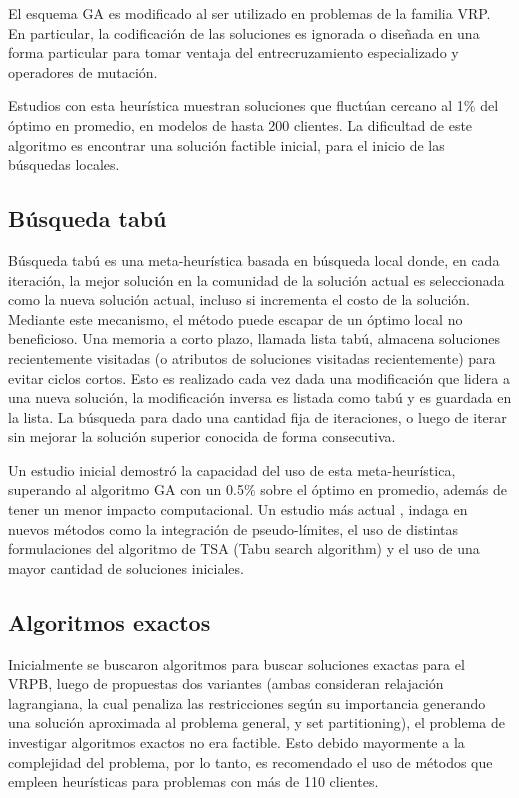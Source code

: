 \documentclass[letter, 10pt]{article}
\begin{document}
El esquema GA es modificado al ser utilizado en problemas de la familia VRP. En particular, la codificación de las soluciones es ignorada o diseñada en una forma particular para tomar ventaja del entrecruzamiento especializado y operadores de mutación.

Estudios \cite{potvin1996genetic} con esta heurística muestran soluciones que fluctúan cercano al 1\% del óptimo en promedio, en modelos de hasta 200 clientes. La dificultad de este algoritmo es encontrar una solución factible inicial, para el inicio de las búsquedas locales.

\subsection{Búsqueda tabú}
Búsqueda tabú \cite{glover1997tabu} es una meta-heurística basada en búsqueda local donde, en cada iteración, la mejor solución en la comunidad de la solución actual es seleccionada como la nueva solución actual, incluso si incrementa el costo de la solución. Mediante este mecanismo, el método puede escapar de un óptimo local no beneficioso. Una memoria a corto plazo, llamada lista tabú, almacena soluciones recientemente visitadas (o atributos de soluciones visitadas recientemente) para evitar ciclos cortos. Esto es realizado cada vez dada una modificación que lidera a una nueva solución, la modificación inversa es listada como tabú y es guardada en la lista. La búsqueda para dado una cantidad fija de iteraciones, o luego de iterar sin mejorar la solución superior conocida de forma consecutiva.

Un estudio inicial \cite{duhamel1997tabu} demostró la capacidad del uso de esta meta-heurística, superando al algoritmo GA con un 0.5\% sobre el óptimo en promedio, además de tener un menor impacto computacional. Un estudio más actual \cite{brandao2006new}, indaga en nuevos métodos como la integración de pseudo-límites, el uso de distintas formulaciones del algoritmo de TSA (Tabu search algorithm) y el uso de una mayor cantidad de soluciones iniciales.

\subsection{Algoritmos exactos}
Inicialmente se buscaron algoritmos para buscar soluciones exactas para el VRPB, luego de propuestas dos variantes \cite{mingozzi1999exact}\cite{toth1997exact} (ambas consideran relajación lagrangiana, la cual penaliza las restricciones según su importancia generando una solución aproximada al problema general, y set partitioning), el problema de investigar algoritmos exactos no era factible. Esto debido mayormente a la complejidad del problema, por lo tanto, es recomendado el uso de métodos que empleen heurísticas para problemas con más de 110 clientes.
\end{document}
